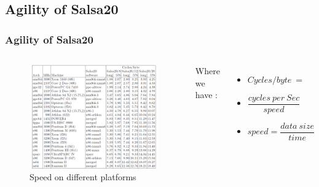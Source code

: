 \subsection{Agility of Salsa20}

\begin{frame}
\frametitle{Agility of Salsa20}
\begin{columns}[c]

\begin{figure}
    \includegraphics[scale=0.24]{speed.png}
    \tiny{\caption{Speed on different platforms}}
\end{figure}

Where we have : 
\begin{itemize}
    \item \small{${Cycles/byte} \ = $}
    \item[] $\dfrac{cycles \ per \ Sec}{speed}$
    \item \small{${speed = \dfrac{data \ size}{time}}$}
\end{itemize}

\end{columns}

\end{frame}